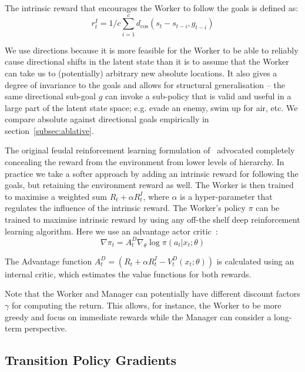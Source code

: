 The intrinsic reward that encourages the Worker to follow the goals is defined as: 
\begin{equation}
r^I_t = 1/c \sum_{i=1}^c d_{\cos}(s_{t} - s_{t-i}, g_{t-i}) 
\label{eqn:intrinsic_reward}
\end{equation}


We use directions because it is more feasible for the Worker to be able to reliably cause directional shifts in the latent state than it is to assume that the Worker can take us to (potentially) arbitrary new absolute locations. It also gives a degree of invariance to the goals and allows for structural generalisation -- the same directional sub-goal $g$ can invoke a sub-policy that is valid and useful in a large part of the latent state space; e.g. evade an enemy, swim up for air, etc. We compare absolute against directional goals empirically in section~\ref{subsec:ablative}. 

The original feudal reinforcement learning formulation of~\citet{dayan1993feudal} advocated completely concealing the reward from the environment from lower levels of hierarchy. In practice we take a softer approach by adding an intrinsic reward for following the goals, but retaining the environment reward as well. The Worker is then trained to maximise a weighted sum $R_t + \alpha R^I_t$, where $\alpha$ is a hyper-parameter that regulates the influence of the intrinsic reward. The Worker’s policy $\pi$ can be trained to maximise intrinsic reward by using any off-the shelf deep reinforcement learning algorithm. Here we use an advantage actor critic~\cite{mnih2016asynchronous}:
\begin{equation}
\nabla \pi_t  = A^D_t \nabla_{\theta}\log\pi(a_t|x_t;\theta)
\label{eqn:doer_update}
\end{equation}

The Advantage function $A^D_t = (R_t + \alpha R^I_t - V^D_t(x_t;\theta))$
is calculated using an internal critic, which estimates the value functions for both rewards.

Note that the Worker and Manager can potentially have different discount factors $\gamma$ for computing the return. 
This allows, for instance, the Worker to be more greedy and focus on immediate rewards while the Manager can consider a long-term perspective.

\subseckiny
\subsection{Transition Policy Gradients}
\subseckiny
\label{subsec:tpg}


